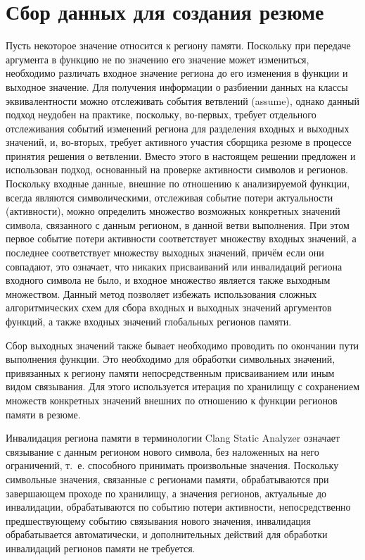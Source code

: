 \section{Сбор данных для создания резюме}

Пусть некоторое значение относится к региону памяти. Поскольку при передаче аргумента в функцию не по значению его значение может измениться, необходимо различать входное значение региона до его изменения в функции и выходное значение. Для получения информации о разбиении данных на классы эквивалентности можно отслеживать события ветвлений (assume), однако данный подход неудобен на практике, поскольку, во-первых, требует отдельного отслеживания событий изменений региона для разделения входных и выходных значений, и, во-вторых, требует активного участия сборщика резюме в процессе принятия решения о ветвлении. Вместо этого в настоящем решении предложен и использован подход, основанный на проверке активности символов и регионов. Поскольку входные данные, внешние по отношению к анализируемой функции, всегда являются символическими, отслеживая событие потери актуальности (активности), можно определить множество возможных конкретных значений символа, связанного с данным регионом, в данной ветви выполнения. При этом первое событие потери активности соответствует множеству входных значений, а последнее соответствует множеству выходных значений, причём если они совпадают, это означает, что никаких присваиваний или инвалидаций региона входного символа не было, и входное множество является также выходным множеством. Данный метод позволяет избежать использования сложных алгоритмических схем для сбора входных и выходных значений аргументов функций, а также входных значений глобальных регионов памяти.

Сбор выходных значений также бывает необходимо проводить по окончании пути выполнения функции. Это необходимо для обработки символьных значений, привязанных к региону памяти непосредственным присваиванием или иным видом связывания. Для этого используется итерация по хранилищу с сохранением множеств конкретных значений внешних по отношению к функции регионов памяти в резюме. 

Инвалидация региона памяти в терминологии Clang Static Analyzer означает связывание с данным регионом нового символа, без наложенных на него ограничений, т.~е. способного принимать произвольные значения. Поскольку символьные значения, связанные с регионами памяти, обрабатываются при завершающем проходе по хранилищу, а значения регионов, актуальные до инвалидации, обрабатываются по событию потери активности, непосредственно предшествующему событию связывания нового значения, инвалидация обрабатывается автоматически, и дополнительных действий для обработки инвалидаций регионов памяти не требуется.

